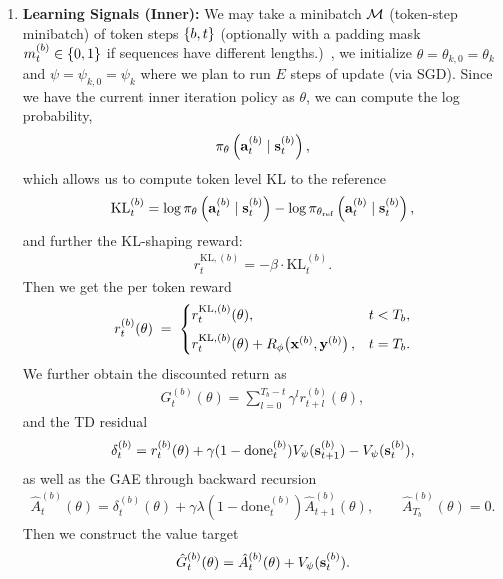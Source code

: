 \documentclass[11pt]{article}  %
\begin{document}
\begin{enumerate}
  \item \textbf{Learning Signals (Inner):} We may take a minibatch $\mathcal{M}$ (token-step minibatch) of token steps $\left\{ b, t \right\}$ (optionally with a padding mask $m^{(b)}_t \in \left\{ 0, 1 \right\}$ if sequences have different lengths.)\ , we initialize $\theta = \theta_{k, 0} = \theta_k$ and $\psi = \psi_{k, 0} = \psi_k$ where we plan to run $E$ steps of update (via SGD).
  Since we have the current inner iteration policy as $\theta$, we can compute the log probability, 
  \begin{align*}
    \pi_{\theta}\left( \mathbf{a}_t^{(b)} \mid \mathbf{s}_t^{(b)} \right),
  \end{align*}
  which allows us to compute token level KL to the reference 
  \begin{align*}
    \text{KL}_t^{(b)} = \log\pi_{\theta}\left( \mathbf{a}_t^{(b)} \mid \mathbf{s}_t^{(b)} \right) - \log \pi_{\theta_{\text{ref}}}\left( \mathbf{a}_t^{(b)} \mid \mathbf{s}_t^{(b)} \right),
  \end{align*}
  and further the KL-shaping reward:
  \begin{align*}
    r_{t}^{\text{KL}, (b)} = -\beta \cdot \text{KL}_t^{(b)}.
  \end{align*}
  Then we get the per token reward 
  \begin{align*}
    r_t^{(b)}(\theta) \;=\; \begin{cases}
      r_{t}^{\text{KL}, (b)}(\theta), & t < T_b, \\[6pt]
      r_{t}^{\text{KL}, (b)}(\theta) + R_{\phi}\!\left(\mathbf{x}^{(b)}, \mathbf{y}^{(b)}\right), & t = T_b.
    \end{cases}
  \end{align*}
  We further obtain the discounted return as  
  \begin{align*}
    G_t^{(b)}(\theta) = \sum_{l=0}^{T_b-t}\gamma^l r_{t+l}^{(b)}(\theta), 
  \end{align*}
  and the TD residual 
  \begin{align*}
    \delta_t^{(b)} = r_{t}^{(b)}(\theta) + \gamma(1 - \text{done}^{(b)}_t)V_{\psi}(\mathbf{s}^{(b)}_{t+1}) - V_{\psi}(\mathbf{s}^{(b)}_t),
  \end{align*}
  as well as the GAE through backward recursion 
  \begin{align*}
    \hat{A}^{(b)}_t (\theta) = \delta_t^{(b)}(\theta) + \gamma\lambda(1 - \text{done}^{(b)}_t)\hat{A}^{(b)}_{t+1} (\theta), \qquad \hat{A}^{(b)}_{T_b} (\theta) = 0.
  \end{align*}
  Then we construct the value target 
  \begin{align*}
    \hat{G}^{(b)}_t (\theta) = \hat{A}^{(b)}_t (\theta) + V_{\psi}(\mathbf{s}^{(b)}_t).
  \end{align*}


\end{enumerate}
\end{document}

